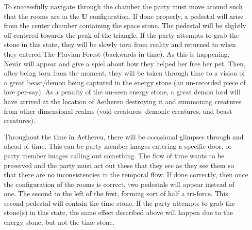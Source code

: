 To successfully navigate through the chamber the party must move around such that the rooms are in the \textbf{U} configuration. If done properly, a pedestal will arise from the center chamber containing the space stone. The pedestal will be slightly off centered towards the peak of the triangle. If the party attempts to grab the stone in this state, they will be slowly torn from reality and returned to when they entered The Pluvian Forest (backwards in time). As this is happening, Nev\'{a}r will appear and give a spiel about how they helped her free her pet. Then, after being torn from the moment, they will be taken through time to a vision of a great beast/demon being captured in the energy stone (an un-recorded piece of lore per-say). As a penalty of the un-seen energy stone, a great demon lord will have arrived at the location of Aethereu destroying it and summoning creatures from other dimensional realms (void creatures, demonic creatures, and beast creatures).

Throughout the time in Aethereu, there will be occasional glimpses through and ahead of time. This can be party member images entering a specific door, or party member images calling out something. The flow of time wants to be preserved and the party must act out these that they see as they see them so that there are no inconsistencies in the temporal flow. If done correctly, then once the configuration of the rooms is correct, two pedestals will appear instead of one. The second to the left of the first, forming sort of half a tri-force. This second pedestal will contain the time stone. If the party attempts to grab the stone(s) in this state, the same effect described above will happen due to the energy stone, but not the time stone.

